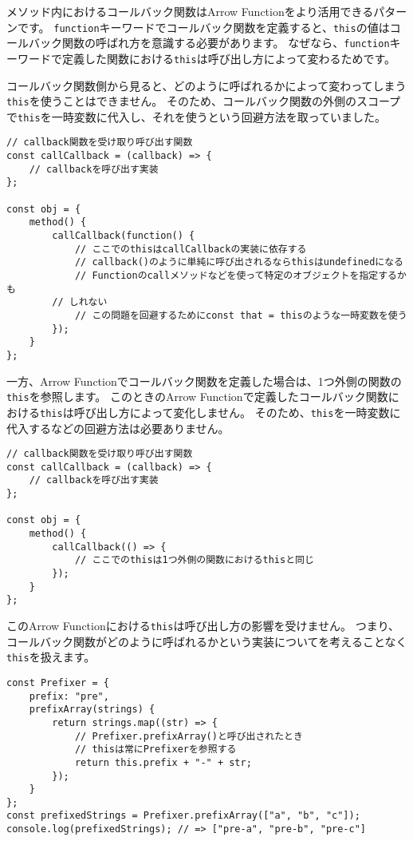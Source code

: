 メソッド内におけるコールバック関数はArrow
Functionをより活用できるパターンです。
\texttt{function}キーワードでコールバック関数を定義すると、\texttt{this}の値はコールバック関数の呼ばれ方を意識する必要があります。
なぜなら、\texttt{function}キーワードで定義した関数における\texttt{this}は呼び出し方によって変わるためです。

コールバック関数側から見ると、どのように呼ばれるかによって変わってしまう\texttt{this}を使うことはできません。
そのため、コールバック関数の外側のスコープで\texttt{this}を一時変数に代入し、それを使うという回避方法を取っていました。

\begin{lstlisting}
// callback関数を受け取り呼び出す関数
const callCallback = (callback) => {
    // callbackを呼び出す実装
};

const obj = {
    method() {
        callCallback(function() {
            // ここでのthisはcallCallbackの実装に依存する
            // callback()のように単純に呼び出されるならthisはundefinedになる
            // Functionのcallメソッドなどを使って特定のオブジェクトを指定するかも
	    // しれない
            // この問題を回避するためにconst that = thisのような一時変数を使う
        });
    }
};
\end{lstlisting}

一方、Arrow
Functionでコールバック関数を定義した場合は、1つ外側の関数の\texttt{this}を参照します。
このときのArrow
Functionで定義したコールバック関数における\texttt{this}は呼び出し方によって変化しません。
そのため、\texttt{this}を一時変数に代入するなどの回避方法は必要ありません。

\begin{lstlisting}
// callback関数を受け取り呼び出す関数
const callCallback = (callback) => {
    // callbackを呼び出す実装
};

const obj = {
    method() {
        callCallback(() => {
            // ここでのthisは1つ外側の関数におけるthisと同じ
        });
    }
};
\end{lstlisting}

このArrow
Functionにおける\texttt{this}は呼び出し方の影響を受けません。
つまり、コールバック関数がどのように呼ばれるかという実装についてを考えることなく\texttt{this}を扱えます。

\begin{lstlisting}
const Prefixer = {
    prefix: "pre",
    prefixArray(strings) {
        return strings.map((str) => {
            // Prefixer.prefixArray()と呼び出されたとき
            // thisは常にPrefixerを参照する
            return this.prefix + "-" + str;
        });
    }
};
const prefixedStrings = Prefixer.prefixArray(["a", "b", "c"]);
console.log(prefixedStrings); // => ["pre-a", "pre-b", "pre-c"]
\end{lstlisting}

